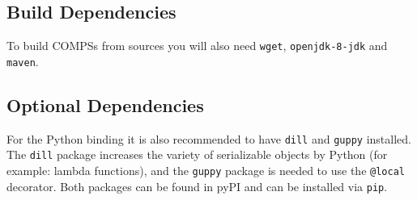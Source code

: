 \subsection{Build Dependencies}

To build COMPSs from sources you will also need \verb|wget|, \verb|openjdk-8-jdk| and \verb|maven|.

\subsection{Optional Dependencies}

For the Python binding it is also recommended to have \verb|dill| and \verb|guppy| installed. The \verb|dill| package increases
the variety of serializable objects by Python (for example: lambda functions), and the \verb|guppy| package is needed to use the \verb|@local|
decorator. Both packages can be found in pyPI and can be installed via \verb|pip|.
